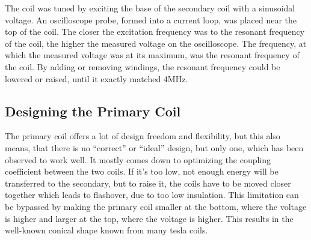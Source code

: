 The coil was tuned by exciting the base of the secondary coil with a sinusoidal voltage. An oscilloscope probe, formed into a current loop, was placed near the top of the coil. The closer the excitation frequency was to the resonant frequency of the coil, the higher the measured voltage on the oscilloscope. The frequency, at which the measured voltage was at its maximum, was the resonant frequency of the coil. By adding or removing windings, the resonant frequency could be lowered or raised, until it exactly matched 4MHz.

\subsection{Designing the Primary Coil} \label{TC-designingThePrimary}

The primary coil offers a lot of design freedom and flexibility, but this also means, that there is no \enquote{correct} or \enquote{ideal} design, but only one, which has been observed to work well. It mostly comes down to optimizing the coupling coefficient between the two coils. If it's too low, not enough energy will be transferred to the secondary, but to raise it, the coils have to be moved closer together which leads to flashover, due to too low insulation. %
This limitation can be bypassed by making the primary coil smaller at the bottom, where the voltage is higher and larger at the top, where the voltage is higher. This results in the well-known conical shape known from many tesla coils.

